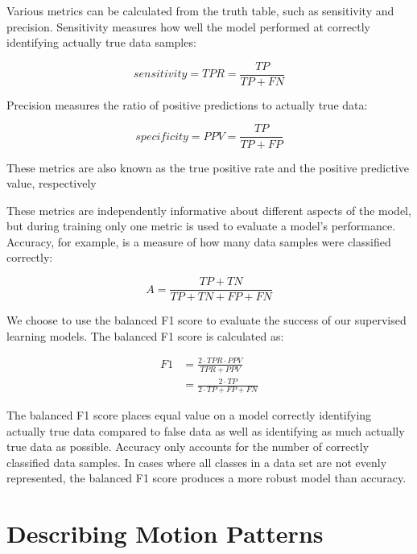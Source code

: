 Various metrics can be calculated from the truth table, such as sensitivity and precision. Sensitivity measures how well the model performed at correctly identifying actually true data samples:

\begin{equation}
sensitivity = TPR = \frac{TP}{TP+FN}
\end{equation}

\noindent Precision measures the ratio of positive predictions to actually true data:

\begin{equation}
specificity = PPV = \frac{TP}{TP+FP}
\end{equation}

These metrics are also known as the true positive rate and the positive predictive value, respectively

These metrics are independently informative about different aspects of the model, but during training only one metric is used to evaluate a model's performance. Accuracy, for example, is a measure of how many data samples were classified correctly:

\begin{equation}
A = \frac{TP+TN}{TP+TN+FP+FN}
\end{equation}

We choose to use the balanced F1 score to evaluate the success of our supervised learning models. The balanced F1 score is calculated as:

\begin{equation}
\begin{split}
F1 & = \frac{2 \cdot TPR \cdot PPV}{TPR+PPV} \\
& = \frac{2 \cdot TP}{2 \cdot TP + FP + FN}
\end{split}
\end{equation}

The balanced F1 score places equal value on a model correctly identifying actually true data compared to false data as well as identifying as much actually true data as possible. Accuracy only accounts for the number of correctly classified data samples. In cases where all classes in a data set are not evenly represented, the balanced F1 score produces a more robust model than accuracy. 


\section{Describing Motion Patterns}

